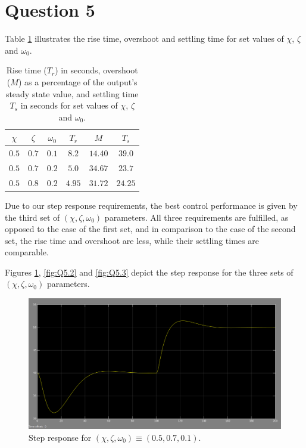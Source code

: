 \section{Question 5}

Table \ref{tbl:Q5} illustrates the rise time, overshoot and settling time for
set values of $\chi$, $\zeta$ and $\omega_0$.

\begin{table}[H]\centering
  \begin{tabular}{ccc|ccc}
  $\chi$  & $\zeta$  & $\omega_0$  & $T_r$  & $M$      & $T_s$   \\ \hline
  $0.5$   & $0.7$    & $0.1$       & $8.2$  & $14.40$  & $39.0$    \\ \hline
  $0.5$   & $0.7$    & $0.2$       & $5.0$  & $34.67$  & $23.7$  \\ \hline
  $0.5$   & $0.8$    & $0.2$       & $4.95$ & $31.72$  & $24.25$ \\ \hline
  \end{tabular}
  \caption{Rise time ($T_r$) in seconds, overshoot ($M$) as a percentage of the
    output's steady state value, and settling time $T_s$ in seconds for set
    values of $\chi$, $\zeta$ and $\omega_0$.}
  \label{tbl:Q5}
\end{table}


Due to our step response requirements, the best control performance is given by
the third set of $(\chi, \zeta, \omega_0)$ parameters. All three requirements
are fulfilled, as opposed to the case of the first set, and in comparison to the
case of the second set, the rise time and overshoot are less, while their
settling times are comparable.

Figures \ref{fig:Q5.1}, \ref{fig:Q5.2} and \ref{fig:Q5.3} depict the step
response for the three sets of $(\chi, \zeta, \omega_0)$ parameters.

\begin{figure}[H]\centering
  \includegraphics[scale=0.3]{./images/5/tank_2_setting_1.png}
  \caption{Step response for $(\chi, \zeta, \omega_0) \equiv (0.5, 0.7, 0.1)$.}
  \label{fig:Q5.1}
\end{figure}

